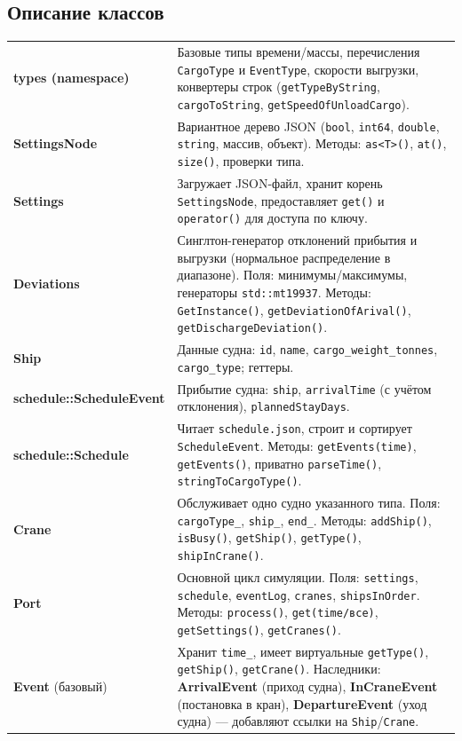 \documentclass[12pt,a4paper]{article}
\begin{document}
\subsection{Описание классов}
\begin{longtable}{p{3.8cm}p{11cm}}
\textbf{types (namespace)} & Базовые типы времени/массы, перечисления \texttt{CargoType} и \texttt{EventType}, скорости выгрузки, конвертеры строк (\texttt{getTypeByString}, \texttt{cargoToString}, \texttt{getSpeedOfUnloadCargo}). \\
\textbf{SettingsNode} & Вариантное дерево JSON (\texttt{bool}, \texttt{int64}, \texttt{double}, \texttt{string}, массив, объект). Методы: \texttt{as<T>()}, \texttt{at()}, \texttt{size()}, проверки типа. \\
\textbf{Settings} & Загружает JSON-файл, хранит корень \texttt{SettingsNode}, предоставляет \texttt{get()} и \texttt{operator()} для доступа по ключу. \\
\textbf{Deviations} & Синглтон-генератор отклонений прибытия и выгрузки (нормальное распределение в диапазоне). Поля: минимумы/максимумы, генераторы \texttt{std::mt19937}. Методы: \texttt{GetInstance()}, \texttt{getDeviationOfArival()}, \texttt{getDischargeDeviation()}. \\
\textbf{Ship} & Данные судна: \texttt{id}, \texttt{name}, \texttt{cargo\_weight\_tonnes}, \texttt{cargo\_type}; геттеры. \\
\textbf{schedule::ScheduleEvent} & Прибытие судна: \texttt{ship}, \texttt{arrivalTime} (с учётом отклонения), \texttt{plannedStayDays}. \\
\textbf{schedule::Schedule} & Читает \verb|schedule.json|, строит и сортирует \texttt{ScheduleEvent}. Методы: \texttt{getEvents(time)}, \texttt{getEvents()}, приватно \texttt{parseTime()}, \texttt{stringToCargoType()}. \\
\textbf{Crane} & Обслуживает одно судно указанного типа. Поля: \texttt{cargoType\_}, \texttt{ship\_}, \texttt{end\_}. Методы: \texttt{addShip()}, \texttt{isBusy()}, \texttt{getShip()}, \texttt{getType()}, \texttt{shipInCrane()}. \\
\textbf{Port} & Основной цикл симуляции. Поля: \texttt{settings}, \texttt{schedule}, \texttt{eventLog}, \texttt{cranes}, \texttt{shipsInOrder}. Методы: \texttt{process()}, \texttt{get(time/все)}, \texttt{getSettings()}, \texttt{getCranes()}. \\
\textbf{Event} (базовый) & Хранит \texttt{time\_}, имеет виртуальные \texttt{getType()}, \texttt{getShip()}, \texttt{getCrane()}. Наследники: \textbf{ArrivalEvent} (приход судна), \textbf{InCraneEvent} (постановка в кран), \textbf{DepartureEvent} (уход судна) — добавляют ссылки на \texttt{Ship}/\texttt{Crane}. \\

\end{longtable}
\end{document}
